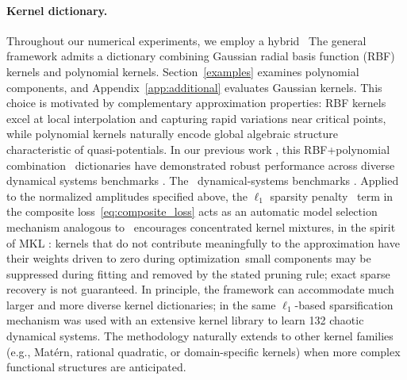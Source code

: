 \documentclass[11pt]{article}
\theoremstyle{plain}      %
\theoremstyle{definition} %
\providecommand{\DIFaddtex}[1]{{\protect\color{blue}#1}} %
\providecommand{\DIFdeltex}[1]{{\protect\color{red}#1}} %
\providecommand{\DIFaddbegin}{} %
\providecommand{\DIFaddend}{} %
\providecommand{\DIFdelbegin}{} %
\providecommand{\DIFdelend}{} %
\providecommand{\DIFadd}[1]{\texorpdfstring{\DIFaddtex{#1}}{#1}} %
\providecommand{\DIFdel}[1]{\texorpdfstring{\DIFdeltex{#1}}{}} %
\newcommand{\DIFscaledelfig}{1.0}
\newlength{\DIFdelgraphicswidth} %
\newlength{\DIFdelgraphicsheight} %
\newcommand{\DIFaddincludegraphics}[2][]{{\color{blue}\fbox{\DIFOincludegraphics[#1]{#2}}}} %
\newcommand{\DIFdelincludegraphics}[2][]{%
\sbox{\DIFdelgraphicsbox}{\DIFOincludegraphics[#1]{#2}}%
\settoboxwidth{\DIFdelgraphicswidth}{\DIFdelgraphicsbox} %
\settoboxtotalheight{\DIFdelgraphicsheight}{\DIFdelgraphicsbox} %
\scalebox{\DIFscaledelfig}{%
\parbox[b]{\DIFdelgraphicswidth}{\usebox{\DIFdelgraphicsbox}\\[-\baselineskip] \rule{\DIFdelgraphicswidth}{0em}}\llap{\resizebox{\DIFdelgraphicswidth}{\DIFdelgraphicsheight}{%
\setlength{\unitlength}{\DIFdelgraphicswidth}%
\begin{picture}(1,1)%
\thicklines\linethickness{2pt} %
{\color[rgb]{1,0,0}\put(0,0){\framebox(1,1){}}}%
{\color[rgb]{1,0,0}\put(0,0){\line( 1,1){1}}}%
{\color[rgb]{1,0,0}\put(0,1){\line(1,-1){1}}}%
\end{picture}%
}\hspace*{3pt}}} %
} %
\DeclareRobustCommand{\DIFaddbegin}{\DIFOaddbegin \let\includegraphics\DIFaddincludegraphics} %
\DeclareRobustCommand{\DIFaddend}{\DIFOaddend \let\includegraphics\DIFOincludegraphics} %
\DeclareRobustCommand{\DIFdelbegin}{\DIFOdelbegin \let\includegraphics\DIFdelincludegraphics} %
\DeclareRobustCommand{\DIFdelend}{\DIFOaddend \let\includegraphics\DIFOincludegraphics} %
\begin{document}
\paragraph{Kernel dictionary.}
\DIFdelbegin \DIFdel{Throughout our numerical experiments, we employ a hybrid }\DIFdelend\ \DIFaddbegin \DIFadd{The general framework admits a }\DIFaddend dictionary combining Gaussian radial basis function (RBF) kernels and polynomial kernels. \DIFaddbegin \DIFadd{Section~\ref{examples} examines polynomial components, and Appendix~\ref{app:additional} evaluates Gaussian kernels. }\DIFaddend This choice is motivated by complementary approximation properties: RBF kernels excel at local interpolation and capturing rapid variations near critical points, while polynomial kernels naturally encode global algebraic structure characteristic of quasi-potentials. \DIFdelbegin \DIFdel{In our previous work \cite{hamzi2021learning}, this }\DIFdelend RBF+polynomial \DIFdelbegin \DIFdel{combination }\DIFdelend\ \DIFaddbegin \DIFadd{dictionaries have }\DIFaddend demonstrated robust performance across diverse \DIFdelbegin \DIFdel{dynamical systems benchmarks . The }\DIFdelend\ \DIFaddbegin \DIFadd{dynamical-systems benchmarks \cite{hamzi2021learning}. Applied to the normalized amplitudes specified above, the }\DIFaddend $\ell_1$ \DIFdelbegin \DIFdel{sparsity penalty }\DIFdelend\ \DIFaddbegin \DIFadd{term }\DIFaddend in the composite loss~\eqref{eq:composite_loss} \DIFdelbegin \DIFdel{acts as an automatic model selection mechanism analogous to }\DIFdelend\ \DIFaddbegin \DIFadd{encourages concentrated kernel mixtures, in the spirit of }\DIFaddend MKL \cite{lanckriet2004learning, bach2004multiple}: \DIFdelbegin \DIFdel{kernels that do not contribute meaningfully to the approximation have their weights driven to zero during optimization}\DIFdelend\ \DIFaddbegin \DIFadd{small components may be suppressed during fitting and removed by the stated pruning rule; exact sparse recovery is not guaranteed}\DIFaddend . In principle, the framework can accommodate much larger and more diverse kernel dictionaries; in \cite{bh_sparse_kfs} the same $\ell_1$-based sparsification mechanism was used with an extensive kernel library to learn 132 chaotic dynamical systems. The methodology naturally extends to other kernel families (e.g., Mat\'ern, rational quadratic, or domain-specific kernels) when more complex functional structures are anticipated.
\end{document}
